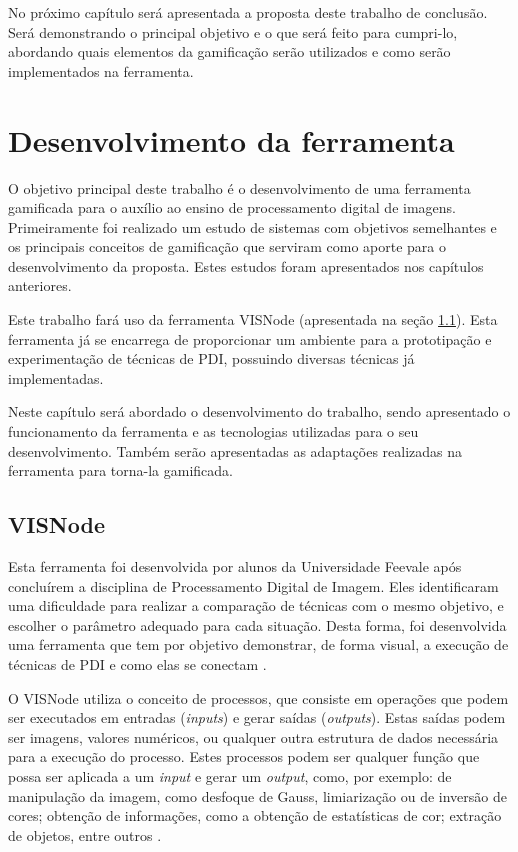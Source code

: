 \documentclass[
	12pt,				%
	oneside,			%
	a4paper,			%
	english,			%
	french,				%
	spanish,			%
	brazil,				%
	]{abntex2}
\begin{document}
No próximo capítulo será apresentada a proposta deste trabalho de conclusão. Será demonstrando o principal objetivo e o que será feito para cumpri-lo, abordando quais elementos da gamificação serão utilizados e como serão implementados na ferramenta.

\chapter{Desenvolvimento da ferramenta} 
\label{sec:desenvolvimentoFerramenta}

O objetivo principal deste trabalho é o desenvolvimento de uma ferramenta gamificada para o auxílio ao ensino de processamento digital de imagens. Primeiramente foi realizado um estudo de sistemas com objetivos semelhantes e os principais conceitos de gamificação que serviram como aporte para o desenvolvimento da proposta. Estes estudos foram apresentados nos capítulos anteriores.
    
Este trabalho fará uso da ferramenta VISNode (apresentada na seção \ref{sec:visnode}). Esta ferramenta já se encarrega de proporcionar um ambiente para a prototipação e experimentação de técnicas de PDI, possuindo diversas técnicas já implementadas. 

Neste capítulo será abordado o desenvolvimento do trabalho, sendo apresentado o funcionamento da ferramenta e as tecnologias utilizadas para o seu desenvolvimento. Também serão apresentadas as adaptações realizadas na ferramenta para torna-la gamificada.
   
\section{VISNode}
\label{sec:visnode}

Esta ferramenta foi desenvolvida por alunos da Universidade Feevale após concluírem a disciplina de Processamento Digital de Imagem. Eles identificaram uma dificuldade para realizar a comparação de técnicas com o mesmo objetivo, e escolher o parâmetro adequado para cada situação. Desta forma, foi desenvolvida uma ferramenta que tem por objetivo demonstrar, de forma visual,  a execução de técnicas de PDI e como elas se conectam \cite{visnode}.

O VISNode utiliza o conceito de processos, que consiste em operações que podem ser executados em entradas (\textit{inputs}) e gerar saídas (\textit{outputs}). Estas saídas podem ser imagens, valores numéricos, ou qualquer outra estrutura de dados necessária para a execução do processo. Estes processos podem ser qualquer função que possa ser aplicada a um \textit{input} e gerar um \textit{output}, como, por exemplo: de manipulação da imagem, como desfoque de Gauss, limiarização ou de inversão de cores; obtenção de informações, como a obtenção de estatísticas de cor;  extração de objetos, entre outros \cite{visnode}.
\end{document}
